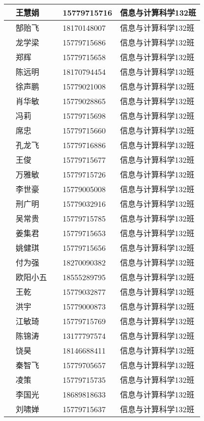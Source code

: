 \documentclass[12pt,a4paper]{article}
\begin{document}
\begin{CJK}{UTF8}{gbsn}
\begin{flushleft}
\begin{longtable}{|l|l|l|l|l|}
     & 王慧娟	&  & 			15779715716 & 信息与计算科学132班 \\ \hline 
     & 郜贻飞	&  & 			18170148007 & 信息与计算科学132班 \\ \hline 
     & 龙学梁	&  & 			15779715686 & 信息与计算科学132班 \\ \hline 
     & 郑辉		&  & 			15779715658 & 信息与计算科学132班 \\ \hline 
     & 陈远明	&  & 			18170794454 & 信息与计算科学132班 \\ \hline 
     & 徐声鹏 	&  & 			15779021008 & 信息与计算科学132班 \\ \hline 
     & 肖华敏	&  & 			15779028865 & 信息与计算科学132班 \\ \hline 
     & 冯莉		&  & 			15779715698 & 信息与计算科学132班 \\ \hline 
     & 席忠		&  & 			15779715660 & 信息与计算科学132班 \\ \hline 
     & 孔龙飞	&  & 			15779716886 & 信息与计算科学132班 \\ \hline 
     & 王俊		&  & 			15779715677 & 信息与计算科学132班 \\ \hline 
     & 万雅敏	&  & 			15779715726 & 信息与计算科学132班 \\ \hline 
     & 李世豪	&  & 			15779005008 & 信息与计算科学132班 \\ \hline 
     & 刑广明	&  & 			15779032916 & 信息与计算科学132班 \\ \hline 
     & 吴常贵	&  & 			15779715785 & 信息与计算科学132班 \\ \hline 
     & 姜集君	&  & 			15779715653 & 信息与计算科学132班 \\ \hline 
     & 姚健琪	&  & 			15779715656 & 信息与计算科学132班 \\ \hline 
     & 付为强	&  & 			18270090382 & 信息与计算科学132班 \\ \hline 
     & 欧阳小五	&  & 			18555289795 & 信息与计算科学132班 \\ \hline 
     & 王乾		&  & 			15779032877 & 信息与计算科学132班 \\ \hline 
     & 洪宇		&  & 			15779000873 & 信息与计算科学132班 \\ \hline 
     & 江敏琦	&  & 			15779715769 & 信息与计算科学132班 \\ \hline 
     & 陈锦涛	&  & 			13177797574 & 信息与计算科学132班 \\ \hline 
     & 饶昊		&  & 			18146688411 & 信息与计算科学132班 \\ \hline 
     & 秦智飞	&  & 			15779705657 & 信息与计算科学132班 \\ \hline 
     & 凌策		&  & 			15779715735 & 信息与计算科学132班 \\ \hline 
     & 李国光	&  & 			18689818633 & 信息与计算科学132班 \\ \hline 
     & 刘啸婵	&  & 			15779715637 & 信息与计算科学132班 \\ \hline 


\end{longtable}
\end{flushleft}
\end{CJK}
\end{document}
